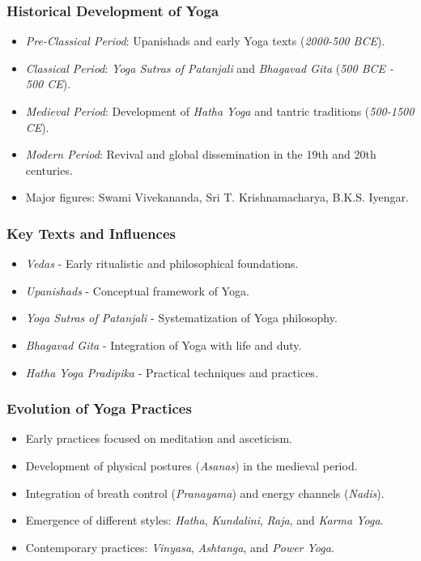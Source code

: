 \begin{frame}[fragile]\frametitle{Historical Development of Yoga}

      \begin{itemize}
		\item \textit{Pre-Classical Period}: Upanishads and early Yoga texts (\textit{2000-500 BCE}).
		\item \textit{Classical Period}: \textit{Yoga Sutras of Patanjali} and \textit{Bhagavad Gita} (\textit{500 BCE - 500 CE}).
		\item \textit{Medieval Period}: Development of \textit{Hatha Yoga} and tantric traditions (\textit{500-1500 CE}).
		\item \textit{Modern Period}: Revival and global dissemination in the 19th and 20th centuries.
		\item Major figures: Swami Vivekananda, Sri T. Krishnamacharya, B.K.S. Iyengar.
	  \end{itemize}

\end{frame}

\begin{frame}[fragile]\frametitle{Key Texts and Influences}

      \begin{itemize}
		\item \textit{Vedas} - Early ritualistic and philosophical foundations.
		\item \textit{Upanishads} - Conceptual framework of Yoga.
		\item \textit{Yoga Sutras of Patanjali} - Systematization of Yoga philosophy.
		\item \textit{Bhagavad Gita} - Integration of Yoga with life and duty.
		\item \textit{Hatha Yoga Pradipika} - Practical techniques and practices.
	  \end{itemize}

\end{frame}

\begin{frame}[fragile]\frametitle{Evolution of Yoga Practices}

      \begin{itemize}
		\item Early practices focused on meditation and asceticism.
		\item Development of physical postures (\textit{Asanas}) in the medieval period.
		\item Integration of breath control (\textit{Pranayama}) and energy channels (\textit{Nadis}).
		\item Emergence of different styles: \textit{Hatha}, \textit{Kundalini}, \textit{Raja}, and \textit{Karma Yoga}.
		\item Contemporary practices: \textit{Vinyasa}, \textit{Ashtanga}, and \textit{Power Yoga}.
	  \end{itemize}

\end{frame}



